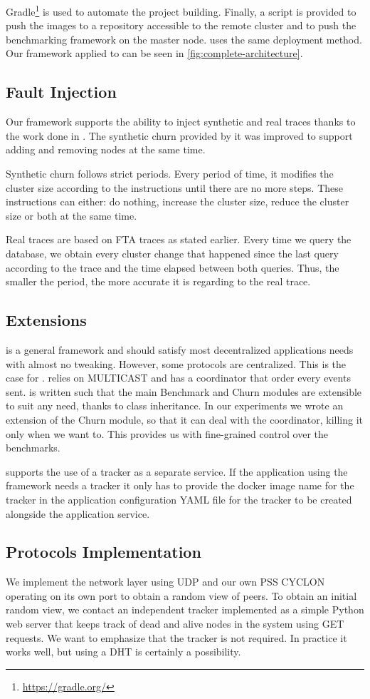 Gradle\footnote{\href{https://gradle.org/}{https://gradle.org/}} is used to automate the project building. Finally, a script is provided to push the images to a repository accessible to the remote cluster and to push the benchmarking framework on the master node. \jgroups uses the same deployment method. Our framework applied to \epto can be seen in \autoref{fig:complete-architecture}.
\subsection{Fault Injection}
Our framework supports the ability to inject synthetic and real traces thanks to the work done in \autocite{vaucher2016erasure}. The synthetic churn provided by it was improved to support adding and removing nodes at the same time.

Synthetic churn follows strict periods. Every period of time, it modifies the cluster size according to the instructions until there are no more steps. These instructions can either: do nothing, increase the cluster size, reduce the cluster size or both at the same time.

Real traces are based on FTA traces as stated earlier. Every time we query the database, we obtain every cluster change that happened since the last query according to the trace and the time elapsed between both queries. Thus, the smaller the period, the more accurate it is regarding to the real trace.
\subsection{Extensions}
\eptotester is a general framework and should satisfy most decentralized applications needs with almost no tweaking. However, some protocols are centralized. This is the case for \jgroups. \jgroups relies on MULTICAST and has a coordinator that order every events sent. \eptotester is written such that the main Benchmark and Churn modules are extensible to suit any need, thanks to class inheritance. In our experiments we wrote an extension of the Churn module, so that it can deal with the coordinator, killing it only when we want to. This provides us with fine-grained control over the benchmarks. 

\eptotester supports the use of a tracker as a separate service. If the application using the framework needs a tracker it only has to provide the docker image name for the tracker in the application configuration YAML file for the tracker to be created alongside the application service.
\subsection{Protocols Implementation}
We implement the network layer using UDP and our own PSS CYCLON operating on its own port to obtain a random view of peers. To obtain an initial random view, we contact an independent tracker implemented as a simple Python web server that keeps track of dead and alive nodes in the system using GET requests. We want to emphasize that the tracker is not required. In practice it works well, but using a DHT is certainly a possibility.

